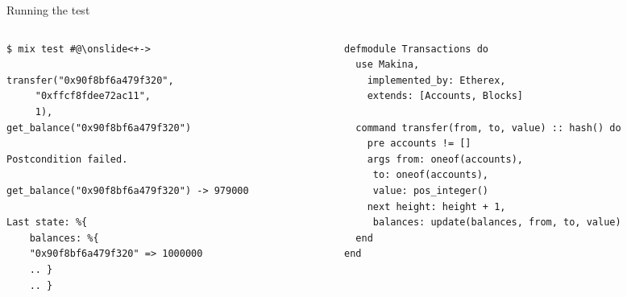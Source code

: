 \documentclass[aspectratio=169, 10pt]{beamer}
\begin{document}
\begin{frame}[label={sec:org727d3b8},fragile]{Running the test}
 \begin{columns}
\begin{column}{0.44\columnwidth}
\onslide<+->
\lstset{language=bash,label= ,caption= ,captionpos=b,numbers=none,style=shell}
\begin{lstlisting}
$ mix test #@\onslide<+->

transfer("0x90f8bf6a479f320",
	 "0xffcf8fdee72ac11",
	 1),
get_balance("0x90f8bf6a479f320")

Postcondition failed.

get_balance("0x90f8bf6a479f320") -> 979000

Last state: %{
    balances: %{
	"0x90f8bf6a479f320" => 1000000
	.. }
    .. }
\end{lstlisting}
\end{column}

\begin{column}{0.52\columnwidth}
\lstset{language=elixir,label= ,caption= ,captionpos=b,numbers=none,style=display}
\begin{lstlisting}
defmodule Transactions do
  use Makina,
    implemented_by: Etherex,
    extends: [Accounts, Blocks]

  command transfer(from, to, value) :: hash() do
    pre accounts != []
    args from: oneof(accounts),
	 to: oneof(accounts),
	 value: pos_integer()
    next height: height + 1,
	 balances: update(balances, from, to, value)
  end
end
\end{lstlisting}
\end{column}
\end{columns}
\end{frame}
\end{document}

